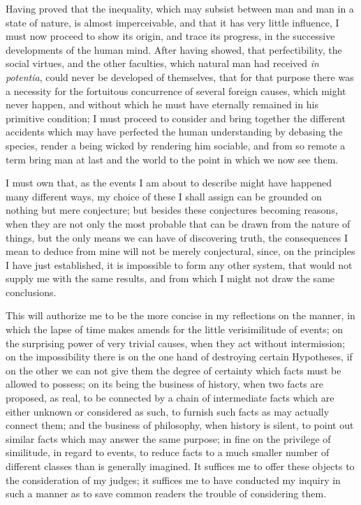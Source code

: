 \documentclass[11pt,twocolumn]{ltugboat}
\begin{document}
Having proved that the inequality, which may subsist between man and
man in a state of nature, is almost imperceivable, and that it has
very little influence, I must now proceed to show its origin, and
trace its progress, in the successive developments of the human mind.
After having showed, that perfectibility, the social virtues, and the
other faculties, which natural man had received \textit{in potentia}, could
never be developed of themselves, that for that purpose there was a
necessity for the fortuitous concurrence of several foreign causes,
which might never happen, and without which he must have eternally
remained in his primitive condition; I must proceed to consider and
bring together the different accidents which may have perfected the
human understanding by debasing the species, render a being wicked by
rendering him sociable, and from so remote a term bring man at last
and the world to the point in which we now see them.

I must own that, as the events I am about to describe might have
happened many different ways, my choice of these I shall assign can be
grounded on nothing but mere conjecture; but besides these conjectures
becoming reasons, when they are not only the most probable that can be
drawn from the nature of things, but the only means we can have of
discovering truth, the consequences I mean to deduce from mine will
not be merely conjectural, since, on the principles I have just
established, it is impossible to form any other system, that would not
supply me with the same results, and from which I might not draw the
same conclusions.

This will authorize me to be the more concise in my reflections on the
manner, in which the lapse of time makes amends for the little
verisimilitude of events; on the surprising power of very trivial
causes, when they act without intermission; on the impossibility there
is on the one hand of destroying certain Hypotheses, if on the other
we can not give them the degree of certainty which facts must be
allowed to possess; on its being the business of history, when two
facts are proposed, as real, to be connected by a chain of
intermediate facts which are either unknown or considered as such, to
furnish such facts as may actually connect them; and the business of
philosophy, when history is silent, to point out similar facts which
may answer the same purpose; in fine on the privilege of similitude,
in regard to events, to reduce facts to a much smaller number of
different classes than is generally imagined. It suffices me to offer
these objects to the consideration of my judges; it suffices me to
have conducted my inquiry in such a manner as to save common readers
the trouble of considering them.
\end{document}
